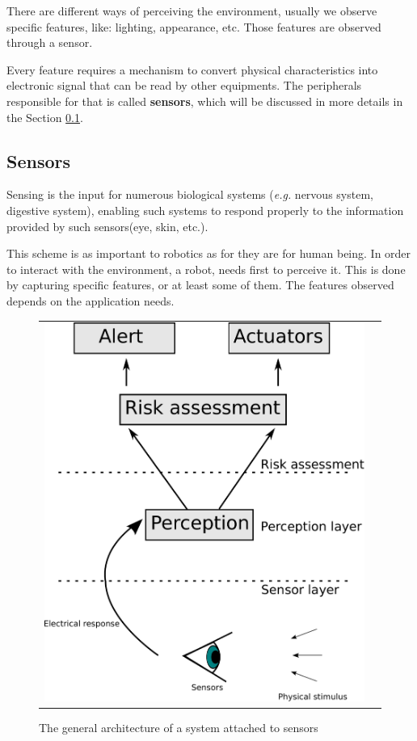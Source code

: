 There are different ways of perceiving the environment, usually we observe specific features, like: lighting, appearance, etc. Those features are observed through a sensor.

Every feature requires a mechanism to convert physical characteristics into electronic signal that can be read by other equipments. The peripherals responsible for that is called \textbf{sensors}, which will be discussed in more details in the Section \ref{sec:sensors}.


\subsection{Sensors}
\label{sec:sensors}


Sensing is the input for numerous biological systems (\textit{e.g.} nervous system, digestive system), enabling such systems to respond properly to the information provided by such sensors(eye, skin, etc.). 

This scheme is as important to robotics as for they are for human being. In order to interact with the environment, a robot, needs first to perceive it. This is done by capturing specific features, or at least some of them. The features observed depends on the application needs.

\begin{figure}[h]
   \centering
     \begin{tabular}{lr}
       \includegraphics[scale=0.45]{img/fig:sensors:role}
     \end{tabular}
   \caption{The general architecture of a system attached to sensors}
   \label{fig:sensors:role}
 \end{figure}

